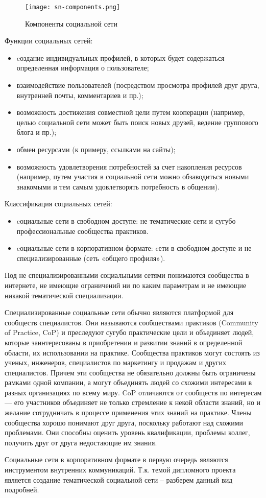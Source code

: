 \begin{figure}[H]
	\centering
	\texttt{[image: sn-components.png]} 
	\caption{Компоненты социальной сети}
	\label{fig:analysis:snComponents}
\end{figure}

Функции социальных сетей:
\begin{itemize}
	\item cоздание индивидуальных профилей, в которых будет содержаться определенная информация о пользователе;
	\item взаимодействие пользователей (посредством просмотра профилей друг друга, внутренней почты, комментариев и пр.);
	\item возможность достижения совместной цели путем кооперации (например, целью социальной сети может быть поиск новых друзей, ведение группового блога и пр.);
	\item обмен ресурсами (к примеру, ссылками на сайты);
	\item возможность удовлетворения потребностей за счет накопления ресурсов (например, путем участия в социальной сети можно обзаводиться новыми знакомыми и тем самым удовлетворять потребность в общении).
\end{itemize}

Классификация социальных сетей:
\begin{itemize}
	\item cоциальные сети в свободном доступе: не тематические сети и сугубо профессиональные сообщества практиков.
	\item cоциальные сети в корпоративном формате: cети в свободном доступе и не специализированные (сеть «общего профиля»).
\end{itemize}

Под не специализированными социальными сетями понимаются сообщества в интернете, не имеющие ограничений ни по каким параметрам и не имеющие никакой тематической специализации.

Специализированные социальные сети обычно являются платформой для сообществ специалистов. Они называются сообществами практиков (Community of Practice, CoP) и преследуют сугубо практические цели и объединяет людей, которые заинтересованы в приобретении и развитии знаний в определенной области, их использовании на практике. Сообщества практиков могут состоять из ученых, инженеров, специалистов по маркетингу и продажам и других специалистов. Причем эти сообщества не обязательно должны быть ограничены рамками одной компании, а могут объединять людей со схожими интересами в разных организациях по всему миру. CoP отличаются от сообществ по интересам — его участников объединяет не только стремление к некой области знаний, но и желание сотрудничать в процессе применения этих знаний на практике. Члены сообщества хорошо понимают друг друга, поскольку работают над схожими проблемами. Они способны оценить уровень квалификации, проблемы коллег, получить друг от друга недостающие им знания.

Социальные сети в корпоративном формате в первую очередь являются инструментом внутренних коммуникаций.
Т.к. темой дипломного проекта является создание тематической социальной сети -- разберем данный вид подробней.


